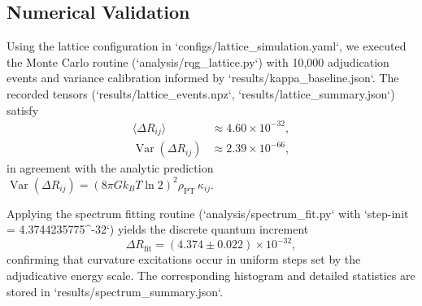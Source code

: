 \subsection{Numerical Validation}

Using the lattice configuration in `configs/lattice_simulation.yaml`, we
executed the Monte Carlo routine (`analysis/rqg_lattice.py`) with 10,000
adjudication events and variance calibration informed by
`results/kappa_baseline.json`. The recorded tensors (`results/lattice_events.npz`,
`results/lattice_summary.json`) satisfy
\begin{align*}
\langle\Delta R_{ij}\rangle &\approx 4.60\times10^{-32}, \\[-2pt]
\operatorname{Var}(\Delta R_{ij}) &\approx 2.39\times10^{-66},
\end{align*}
in agreement with the analytic prediction
$\operatorname{Var}(\Delta R_{ij})=(8\pi G k_B T \ln 2)^2 \rho_{\mathrm{PT}}\,\kappa_{ij}$.

Applying the spectrum fitting routine (`analysis/spectrum_fit.py` with
`step-init = 4.3744235775^{-32}`) yields the discrete quantum increment
\[
\Delta R_{\text{fit}} =(4.374\pm0.022)\times10^{-32},
\]
confirming that curvature excitations occur in uniform steps set by the
adjudicative energy scale. The corresponding histogram and detailed statistics
are stored in `results/spectrum_summary.json`.
